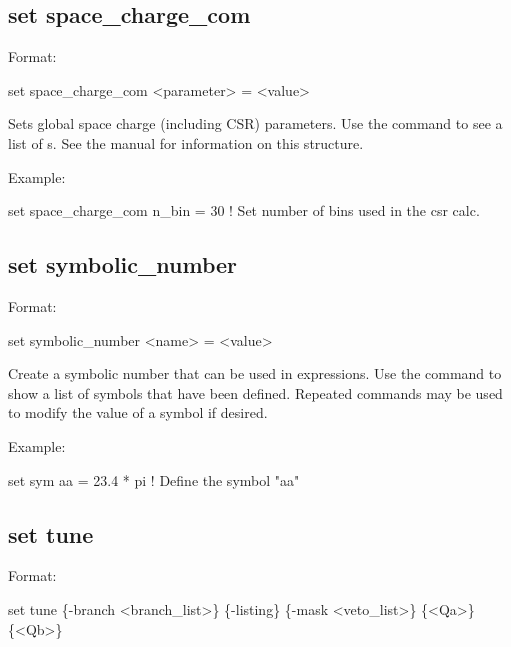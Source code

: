 {{{{{%

\subsection{set space_charge_com}
\label{s:set.sc.com}

Format:
\begin{example}
  set space_charge_com <parameter> = <value>
\end{example}

Sets global space charge (including CSR) parameters. Use the 
command to see a list of s. See the \bmad manual for information on this structure.

Example:
\begin{example}
  set space_charge_com n_bin = 30  ! Set number of bins used in the csr calc.
\end{example}


\subsection{set symbolic_number}
\label{s:set.symbolic}

Format:
\begin{example}
  set symbolic_number <name> = <value>
\end{example}

Create a symbolic number that can be used in expressions. Use the  command
to show a list of symbols that have been defined. Repeated  commands may be used to modify
the value of a symbol if desired.

Example:
\begin{example}
  set sym aa = 23.4 * pi  ! Define the symbol "aa"
\end{example}


\subsection{set tune}
\label{s:set.tune}

Format:
\begin{example}
  set tune \{-branch <branch_list>\} \{-listing\} \{-mask <veto_list>\} \{<Qa>\} \{<Qb>\}
\end{example}

}}}}}

